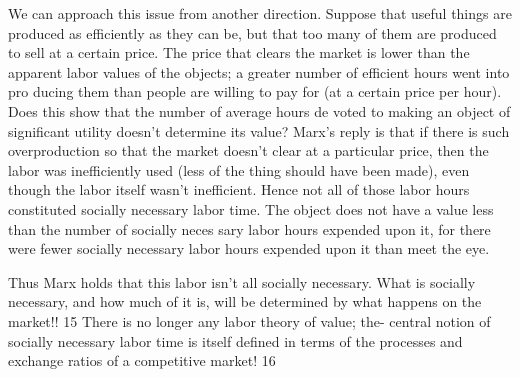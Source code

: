 \documentclass[11pt,openany]{book}
\begin{document}
We can approach this issue from another direction. Suppose that useful things are produced as efficiently as they can be, but that too many of them are produced to sell at a certain price. The price that clears the market is lower than the apparent labor values of the objects; a greater number of efficient hours went into pro ducing them than people are willing to pay for (at a certain price per hour). Does this show that the number of average hours de voted to making an object of significant utility doesn't determine its value? Marx's reply is that if there is such overproduction so that the market doesn't clear at a particular price, then the labor was inefficiently used (less of the thing should have been made), even though the labor itself wasn't inefficient. Hence not all of those labor hours constituted socially necessary labor time. The object does not have a value less than the number of socially neces sary labor hours expended upon it, for there were fewer socially necessary labor hours expended upon it than meet the eye. 

Thus Marx holds that this labor isn't all socially necessary. What is socially necessary, and how much of it is, will be determined by what happens on the market!! 15 There is no longer any labor theory of value; the- central notion of socially necessary labor time is itself defined in terms of the processes and exchange ratios of a competitive market! 16 
\end{document}
